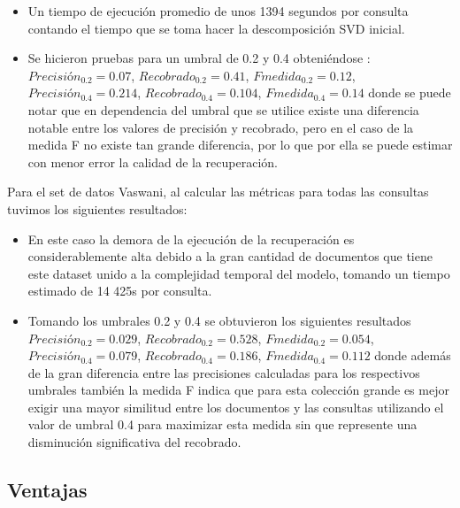 \documentclass[spanish]{article}
\begin{document}
\begin{itemize}

\item Un tiempo de ejecución promedio de unos 1394 segundos por consulta contando el tiempo que se toma hacer la descomposición SVD inicial.

 \item Se hicieron pruebas para un umbral de 0.2 y 0.4 obteniéndose : $Precisión_{0.2}=0.07 $, $Recobrado_{0.2}= 0.41$, $Fmedida_{0.2}=0.12$, $Precisión_{0.4}=0.214 $, $Recobrado_{0.4}= 0.104$, $Fmedida_{0.4}=0.14$ donde se puede notar que en dependencia del umbral que se utilice existe una diferencia notable entre los valores de precisión y recobrado, pero en el caso de la medida F no existe tan grande diferencia, por lo que por ella se puede estimar con menor error la calidad de la recuperación.
 
\end{itemize}
 

Para el set de datos Vaswani, al calcular las métricas para todas las consultas tuvimos los siguientes resultados: 

\begin{itemize}

\item En este caso la demora de la ejecución de la recuperación es considerablemente alta debido a la gran cantidad de documentos que tiene este dataset unido a la complejidad temporal del modelo, tomando un tiempo estimado de 14 425s por consulta.

\item Tomando los umbrales 0.2 y 0.4 se obtuvieron los siguientes resultados $Precisión_{0.2}=0.029 $, $Recobrado_{0.2}= 0.528$, $Fmedida_{0.2}=0.054$, $Precisión_{0.4}=0.079 $, $Recobrado_{0.4}= 0.186$, $Fmedida_{0.4}=0.112$ donde además de la gran diferencia entre las precisiones calculadas para los respectivos umbrales también la medida F indica que para esta colección grande es mejor exigir una mayor similitud entre los documentos y las consultas utilizando el valor de umbral 0.4 para maximizar esta medida sin que represente una disminución significativa del recobrado.

\end{itemize}


\subsection*{Ventajas}
 
\end{document}

